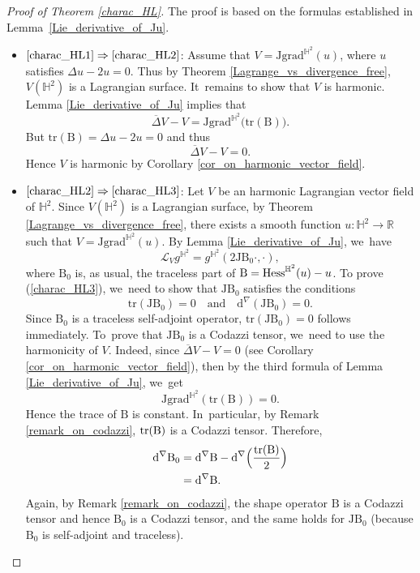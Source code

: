 \documentclass[11pt]{article}
\makeatletter
\DeclareRobustCommand{\mathbbm}[1]{\csname jepbb@#1\endcsname}
\theoremstyle{plain}
\theoremstyle{definition}
\newcommand{\grad}{\mathrm{grad}^{\mathbb{H}^2}}
\newcommand{\hess}{\mathrm{Hess}^{\mathbb{H}^2}}
\newcommand{\J}{\mathrm{J}}
\newcommand{\B}{\mathrm{B}}
\makeatother
\begin{document}
\pagebreak[2]
\begin{proof}[Proof of Theorem \ref{charac_HL}]
The proof is based on the formulas established in Lem\-ma~\ref{Lie_derivative_of_Ju}.

\begin{itemize}
\item
$\eqref{charac_HL1}\Rightarrow\eqref{charac_HL2}$: Assume that \(V = \J \grad(u) \), where \(u \) satisfies \(\Delta u - 2u = 0\). Thus by Theorem \ref{Lagrange_vs_divergence_free}, \(V(\mathbb{H}^2) \) is a Lagrangian surface. It~remains to show that \(V \) is harmonic. Lemma \ref{Lie_derivative_of_Ju} implies that
\[\overline{\Delta} V - V = \J \grad\bigl(\mathrm{tr}(\B)\bigr).\]
But \(\mathrm{tr}(\B) = \Delta u - 2u = 0\) and thus
\[\overline{\Delta} V - V = 0.\]
Hence \(V \) is harmonic by Corollary \ref{cor_on_harmonic_vector_field}.

\item
$\eqref{charac_HL2}\Rightarrow\eqref{charac_HL3}$: Let $V$ be an harmonic Lagrangian vector field of $\mathbb{H}^2$. Since $V(\mathbb{H}^2)$ is a Lagrangian surface, by Theorem \ref{Lagrange_vs_divergence_free}, there exists a smooth function $u:\mathbb{H}^2 \to \mathbb{R}$ such that $V = \J\grad(u)$. By Lemma \ref{Lie_derivative_of_Ju}, we~have
\[ \mathcal{L}_Vg^{\mathbb{H}^2} = g^{\mathbb{H}^2}(2\J\B_0 \cdot, \cdot), \]
where $\B_0$ is, as usual, the traceless part of $\B = \hess(u) - u\mathbbm{1}$. To prove (\ref{charac_HL3}), we~need to show that $\J\B_0$ satisfies the conditions
\[
\mathrm{tr}(\J\B_0) = 0 \quad \text{and} \quad \mathrm{d}^{\nabla}(\J\B_0) = 0.
\]
Since $\B_0$ is a traceless self-adjoint operator, $\mathrm{tr}(\J\B_0) = 0$ follows immediately. To~prove that $\J\B_0$ is a Codazzi tensor, we~need to use the harmonicity of $V$. Indeed, since $\overline{\Delta}V - V = 0$ (see Corollary \ref{cor_on_harmonic_vector_field}), then by the third formula of Lemma \ref{Lie_derivative_of_Ju}, we~get
\[ \J\grad\left(\mathrm{tr}(\B)\right) = 0. \]
Hence the trace of $\B$ is constant. In~particular, by Remark \ref{remark_on_codazzi}, $\mathrm{tr}(\B)\mathbbm{1}$ is a Codazzi tensor. Therefore,
\begin{align*}
\mathrm{d}^{\nabla}\B_0 &= \mathrm{d}^{\nabla}\B - \mathrm{d}^{\nabla}\Bigl(\frac{\mathrm{tr}(\B)\mathbbm{1}}{2} \Bigr) \\
&= \mathrm{d}^{\nabla}\B.
\end{align*}
Again, by Remark \ref{remark_on_codazzi}, the shape operator $\B$ is a Codazzi tensor and hence $\B_0$ is a Codazzi tensor, and the same holds for $\J\B_0$ (because $\B_0$ is self-adjoint and traceless).


\end{itemize}
\end{proof}
\end{document}
